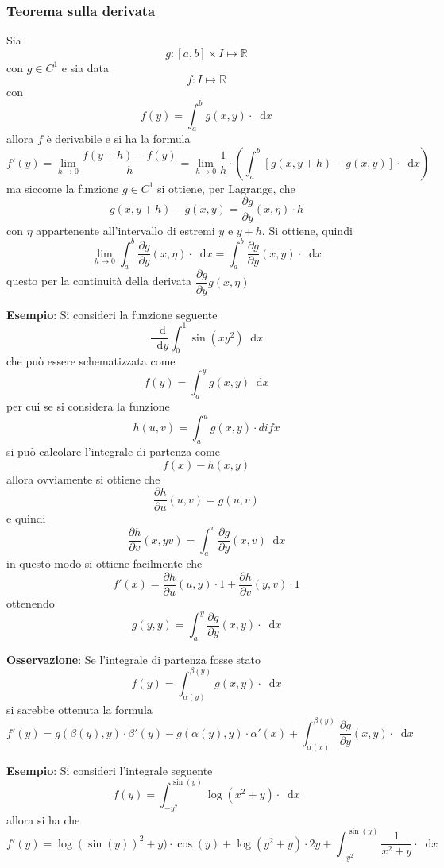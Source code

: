 \documentclass[a4paper]{extarticle}
\newcommand*\dif{\mathop{}\!\mathrm{d}}
\begin{document}
\vspace{1em}
\subsubsection{Teorema sulla derivata}
Sia
\[g : [a,b] \times I \longmapsto \mathbb{R}\]
con $g \in C^1$ e sia data
\[f : I \longmapsto \mathbb{R}\]
con
\[f(y) = \int_a^b g(x,y) \cdot \dif x\]
allora $f$ è derivabile e si ha la formula
\[f'(y) = \lim_{h \to 0} \dfrac{f(y+h) - f(y)}{h} = \lim_{h \to 0} \dfrac{1}{h} \cdot \left(\int_a^b \left[g(x,y+h) - g(x,y)\right] \cdot \dif x\right)\]
ma siccome la funzione $g \in C^1$ si ottiene, per Lagrange, che
\[g(x,y+h) - g(x,y) = \dfrac{\partial g}{\partial y} (x,\eta)\cdot h\]
con $\eta$ appartenente all'intervallo di estremi $y$ e $y+h$. Si ottiene, quindi
\[\lim_{h \to 0} \int_a^b \dfrac{\partial g}{\partial y} (x,\eta) \cdot \dif x = \int_a^b \dfrac{\partial g}{\partial y}(x,y) \cdot \dif x\]
questo per la continuità della derivata $\dfrac{\partial g}{\partial y} g(x,\eta)$

\vspace{2em}
\noindent
\textbf{Esempio}: Si consideri la funzione seguente
\[\dfrac{\dif}{\dif y} \int_0^1 \sin(xy^2) \dif x\]
che può essere schematizzata come
\[f(y) = \int_a^y g(x,y) \dif x\]
per cui se si considera la funzione
\[h(u,v) = \int_a^u g(x,y) \cdot dif x\]
si può calcolare l'integrale di partenza come
\[f(x) - h(x,y)\]
allora ovviamente si ottiene che
\[\dfrac{\partial h}{\partial u} (u,v) = g(u,v)\]
e quindi
\[\dfrac{\partial h}{\partial v} (x,yv) = \int_a^v \dfrac{\partial g}{\partial y} (x,v) \dif x\]
in questo modo si ottiene facilmente che
\[f'(x) = \dfrac{\partial h}{\partial u} (u,y) \cdot 1 + \dfrac{\partial h}{\partial v}(y,v) \cdot 1\]
ottenendo
\[g(y,y) = \int_a^y \dfrac{\partial g}{\partial y}(x,y) \cdot \dif x\]

\vspace{2em}
\noindent
\textbf{Osservazione}: Se l'integrale di partenza fosse stato
\[f(y) = \int_{\alpha(y)}^{\beta(y)} g(x,y) \cdot \dif x\]
si sarebbe ottenuta la formula
\[f'(y) = g(\beta(y), y) \cdot \beta'(y) - g(\alpha(y),y) \cdot \alpha'(x) + \int_{\alpha(x)}^{\beta(y)} \dfrac{\partial g}{\partial y} (x,y) \cdot \dif x\]

\vspace{2em}
\noindent
\textbf{Esempio}: Si consideri l'integrale seguente
\[f(y) = \int_{-y^2}^{\sin(y)} \log(x^2 + y) \cdot \dif x\]
allora si ha che
\[f'(y) = \log(\sin(y))^2 + y) \cdot \cos(y) + \log(y^2 + y) \cdot 2y + \int_{-y^2}^{\sin(y)} \dfrac{1}{x^2+y} \cdot \dif x\]
\end{document}
